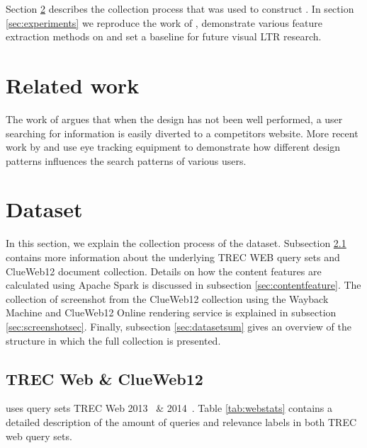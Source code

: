 Section \ref{sec:dataset} describes the collection process that was used to construct \datasetname. In section \ref{sec:experiments} we reproduce the work of \citet{fan2017learning}, demonstrate various feature extraction methods on \datasetname and set a baseline for future visual LTR research.  



\section{Related work}\label{sec:relatedwork}
The work of \citet{nielsen1999designing} argues that when the design has not been well performed, a user searching for information is easily diverted to a competitors website. More recent work by \citet{nielsen2006f} and \citet{pernice2017f} use eye tracking equipment to demonstrate how different design patterns influences the search patterns of various users.


\section{Dataset}\label{sec:dataset}
In this section, we explain the collection process of the \datasetname dataset. Subsection \ref{sec:trecclue} contains more information about the underlying TREC WEB query sets and ClueWeb12 document collection. Details on how the content features are calculated using Apache Spark is discussed in subsection \ref{sec:contentfeature}. The collection of screenshot from the ClueWeb12 collection using the Wayback Machine and ClueWeb12 Online rendering service is explained in subsection \ref{sec:screenshotsec}. Finally, subsection \ref{sec:datasetsum} gives an overview of the structure in which the full collection is presented.

\subsection{TREC Web \& ClueWeb12 }\label{sec:trecclue}
\datasetname uses query sets TREC Web 2013~\cite{collins2013trec} \& 2014~\cite{collins2015trec}. Table \ref{tab:webstats} contains a detailed description of the amount of queries and relevance labels in both TREC web query sets.

